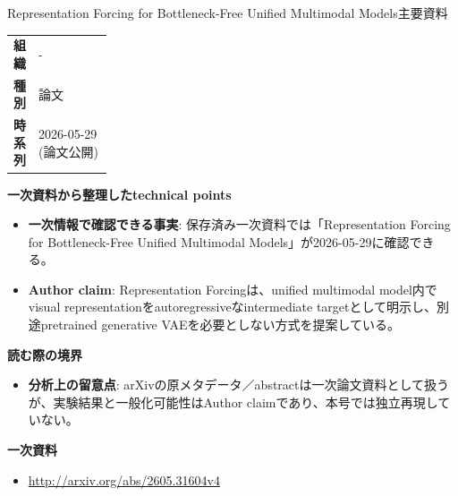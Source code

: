 \begin{technicalnote}{Representation Forcing for Bottleneck-Free Unified Multimodal Models}{主要資料}
\begingroup
\begin{tabularx}{\linewidth}{@{}>{\bfseries}p{0.22\linewidth}X@{}}
組織 & - \\
種別 & 論文 \\
時系列 & 2026-05-29 (論文公開) \\
\end{tabularx}
\smallskip
{\bfseries 一次資料から整理したtechnical points}
\begin{itemize}[leftmargin=1.5em,itemsep=0.35em]
\item \textbf{一次情報で確認できる事実}: 保存済み一次資料では「Representation Forcing for Bottleneck-Free Unified Multimodal Models」が2026-05-29に確認できる。
\end{itemize}
\begin{minipage}{\linewidth}
\begin{itemize}[leftmargin=1.5em,itemsep=0.35em]
\item \textbf{Author claim}: Representation Forcingは、unified multimodal model内でvisual representationをautoregressiveなintermediate targetとして明示し、別途pretrained generative VAEを必要としない方式を提案している。
\end{itemize}
{\bfseries 読む際の境界}
\begin{itemize}[leftmargin=1.5em,itemsep=0.35em]
\item \textbf{分析上の留意点}: arXivの原メタデータ／abstractは一次論文資料として扱うが、実験結果と一般化可能性はAuthor claimであり、本号では独立再現していない。
\end{itemize}
\begin{samepage}
{\bfseries 一次資料}
\begingroup\sloppy
\begin{itemize}[leftmargin=1.5em,itemsep=0.25em]
\item {\scriptsize\url{http://arxiv.org/abs/2605.31604v4}}
\end{itemize}
\endgroup
\end{samepage}
\end{minipage}
\endgroup
\end{technicalnote}
\medskip
